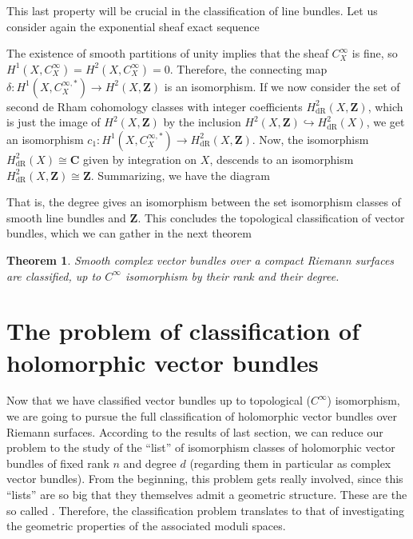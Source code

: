 \documentclass[12pt,a4paper]{book}
\newtheorem{thm}{Theorem}[section]
\theoremstyle{definition} \newtheorem{defn}[thm]{Definition}
\theoremstyle{definition} \newtheorem{ejemplo}[thm]{Example}
\theoremstyle{remark} \newtheorem*{rem}{Remark}
\def\CC{\mathbf{C}}
\def\ZZ{\mathbf{Z}}
\let\emph\relax
\begin{document}
This last property will be crucial in the classification of line bundles. Let us consider again the exponential sheaf exact sequence
      \begin{center}
       \end{center}
       The existence of smooth partitions of unity implies that the sheaf $C^\infty_X$ is fine, so $H^1(X,C^\infty_X)=H^2(X,C^\infty_X)=0$. Therefore, the connecting map $\delta:H^1(X,C^{\infty,*}_X)\rightarrow H^2(X,\ZZ)$ is an isomorphism. If we now consider the set of second de Rham cohomology classes with integer coefficients $H^2_{\mathrm{dR}}(X,\ZZ)$, which is just the image of $H^2(X,\ZZ)$ by the inclusion $H^2(X,\ZZ)\hookrightarrow H^2_{\mathrm{dR}}(X)$, we get an isomorphism $c_1:H^1(X,C_X^{\infty,*})\rightarrow H^2_{\mathrm{dR}}(X,\ZZ)$. Now, the isomorphism $H^2_{\mathrm{dR}}(X) \cong \CC$ given by integration on $X$, descends to an isomorphism $H^2_{\mathrm{dR}}(X,\ZZ) \cong \ZZ$.
    Summarizing, we have the diagram
       \begin{center}
       \end{center}
       That is, the degree gives an isomorphism between the set isomorphism classes of smooth line bundles and $\ZZ$. This concludes the topological classification of vector bundles, which we can gather in the next theorem
       \begin{thm}
	 Smooth complex vector bundles over a compact Riemann surfaces are classified, up to $C^\infty$ isomorphism by their rank and their degree.
       \end{thm}
  
       \section{The problem of classification of holomorphic vector bundles}
       Now that we have classified vector bundles up to topological ($C^\infty$) isomorphism, we are going to pursue the full classification of holomorphic vector bundles over Riemann surfaces. According to the results of last section, we can reduce our problem to the study of the ``list'' of isomorphism classes of holomorphic vector bundles of fixed rank $n$ and degree $d$ (regarding them in particular as complex vector bundles). From the beginning, this problem gets really involved, since this ``lists'' are so big that they themselves admit a geometric structure. These are the so called \emph{moduli spaces}. Therefore, the classification problem translates to that of investigating the geometric properties of the associated moduli spaces.
\end{document}
